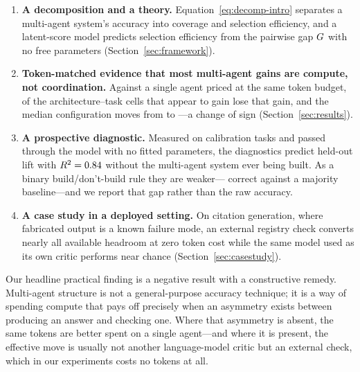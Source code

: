 \begin{enumerate}[leftmargin=1.4em,itemsep=2pt,topsep=3pt]
\item \textbf{A decomposition and a theory.} Equation~\eqref{eq:decomp-intro}
  separates a multi-agent system's accuracy into coverage and selection
  efficiency, and a latent-score model predicts selection efficiency from the
  pairwise gap $G$ with no free parameters (Section~\ref{sec:framework}).
\item \textbf{Token-matched evidence that most multi-agent gains are compute, not
  coordination.} Against a single agent priced at the same token budget,
  \nFlip{} of the architecture--task cells that appear to gain lose that gain,
  and the median configuration moves from \medianNaiveLift{} to
  \medianMatchedLift{}---a change of sign (Section~\ref{sec:results}).
\item \textbf{A prospective diagnostic.} Measured on \nCalib{} calibration
  tasks and passed through the model with no fitted parameters, the
  diagnostics predict held-out lift with $R^2 = 0.84{}$ without the
  multi-agent system ever being built. As a binary build/don't-build rule they
  are weaker---\decisionAgreement{} correct against a \decisionBaseline{}
  majority baseline---and we report that gap rather than the raw accuracy.
\item \textbf{A case study in a deployed setting.} On citation generation,
  where fabricated output is a known failure mode, an external registry check
  converts nearly all available headroom at zero token cost while the same
  model used as its own critic performs near chance
  (Section~\ref{sec:casestudy}).
\end{enumerate}

Our headline practical finding is a negative result with a constructive
remedy. Multi-agent structure is not a general-purpose accuracy technique; it
is a way of spending compute that pays off precisely when an asymmetry exists
between producing an answer and checking one. Where that asymmetry is absent,
the same tokens are better spent on a single agent---and where it is present,
the effective move is usually not another language-model critic but an external
check, which in our experiments costs no tokens at all.
